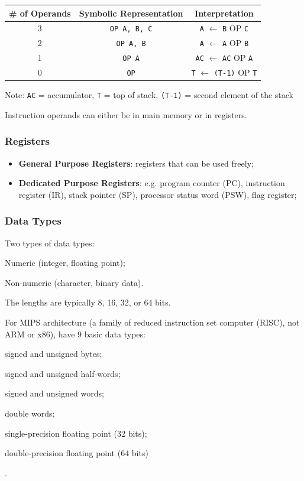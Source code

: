 \begin{table}[H]
    \centering
    \begin{tabular}{|c|c|c|}
        \hline
        \textbf{\# of Operands} & \textbf{Symbolic Representation} & \textbf{Interpretation} \\
        \hline
        3 & \texttt{OP A, B, C} & \texttt{A} $\gets$ \texttt{B} OP \texttt{C} \\
        2 & \texttt{OP A, B} & \texttt{A} $\gets$ \texttt{A} OP \texttt{B} \\
        1 & \texttt{OP A} & \texttt{AC} $\gets$ \texttt{AC} OP \texttt{A} \\
        0 & \texttt{OP} & \texttt{T} $\gets$ \texttt{(T-1)} OP \texttt{T} \\
        \hline
    \end{tabular}
\end{table}

{\footnotesize Note: 
\texttt{AC} = accumulator, \texttt{T} = top of stack, \texttt{(T-1)} = second element of the stack
}

Instruction operands can either be in main memory or in registers.

\subsubsection{Registers}

\begin{itemize}
    \item \textbf{General Purpose Registers}: registers that can be used freely;
    \item \textbf{Dedicated Purpose Registers}: e.g. program counter (PC), instruction register (IR), stack pointer (SP), processor status word (PSW), flag register;
\end{itemize}

\subsubsection{Data Types}

Two types of data types: \begin{enumerate*}[label=\textbf{(\arabic*)}]
    \item Numeric (integer, floating point);
    \item Non-numeric (character, binary data).
\end{enumerate*}
The lengths are typically 8, 16, 32, or 64 bits.

For MIPS architecture (a family of reduced instruction set computer (RISC), not ARM or x86),
have 9 basic data types: \begin{enumerate*}[label=\textbf{(\arabic*)}]
    \item signed and unsigned bytes;
    \item signed and unsigned half-words;
    \item signed and unsigned words;
    \item double words;
    \item single-precision floating point (32 bits);
    \item double-precision floating point (64 bits)
\end{enumerate*}.

